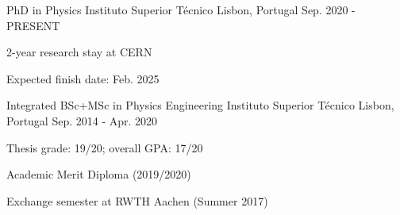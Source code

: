 
\begin{cventries}

\cventry
  {PhD in Physics}
  {Instituto Superior Técnico}
  {Lisbon, Portugal}
  {Sep. 2020 - PRESENT}
  {
    \begin{cvitems}
      \item {2-year research stay at CERN}
      \item {Expected finish date: Feb. 2025}
    \end{cvitems}
  }

  \cventry
    {Integrated BSc+MSc in Physics Engineering} %
    {Instituto Superior Técnico} %
    {Lisbon, Portugal} %
    {Sep. 2014 - Apr. 2020} %
    {
      \begin{cvitems} %
        \item {Thesis grade: 19/20; overall GPA: 17/20}
        \item {Academic Merit Diploma (2019/2020)}
        \item {Exchange semester at RWTH Aachen (Summer 2017)}
      \end{cvitems}
    }



\end{cventries}